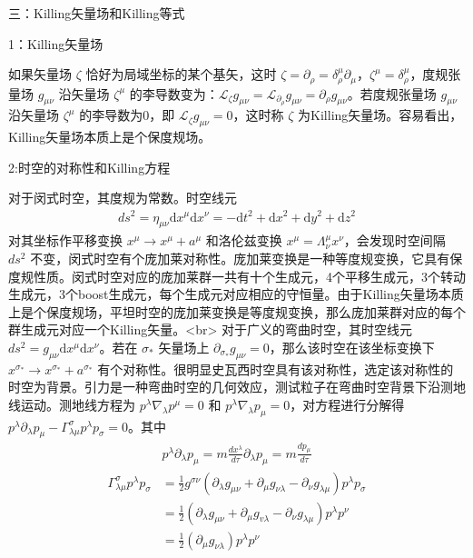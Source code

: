 三：Killing矢量场和Killing等式

1：Killing矢量场

如果矢量场 $\zeta$ 恰好为局域坐标的某个基矢，这时 $\zeta=\partial_{\rho}=\delta_{\rho}^{\mu} \partial_{\mu}$，$\zeta^{\mu}=\delta_{\rho}^{\mu}$，度规张量场 $g_{\mu \nu}$ 沿矢量场 $\zeta^{\mu}$ 的李导数变为：$\mathcal{L}_{\zeta} g_{\mu \nu} =\mathcal{L}_{\partial_{\rho}} g_{\mu \nu}=\partial_{\rho} g_{\mu \nu}$。若度规张量场 $g_{\mu \nu}$ 沿矢量场 $\zeta^{\mu}$ 的李导数为0，即 $\mathcal{L}_{\zeta} g_{\mu \nu} =0$，这时称 $\zeta$ 为Killing矢量场。容易看出，Killing矢量场本质上是个保度规场。

2:时空的对称性和Killing方程

对于闵式时空，其度规为常数。时空线元
$$\begin{aligned}
d s^{2}=\eta_{\mu \nu} \mathrm{d} x^{\mu} \mathrm{d} x^{\nu}=-\mathrm{d} t^{2}+\mathrm{d} x^{2}+\mathrm{d} y^{2}+\mathrm{d} z^{2}
\end{aligned}$$
对其坐标作平移变换 $x^{\mu}\rightarrow x^{\mu}+a^{\mu}$ 和洛伦兹变换 $x^{\mu}=\Lambda^{\mu}_{\nu} x^{\nu}$，会发现时空间隔 $d s^{2}$ 不变，闵式时空有个庞加莱对称性。庞加莱变换是一种等度规变换，它具有保度规性质。闵式时空对应的庞加莱群一共有十个生成元，4个平移生成元，3个转动生成元，3个boost生成元，每个生成元对应相应的守恒量。由于Killing矢量场本质上是个保度规场，平坦时空的庞加莱变换是等度规变换，那么庞加莱群对应的每个群生成元对应一个Killing矢量。<br>
对于广义的弯曲时空，其时空线元 $d s^{2}=g_{\mu \nu} \mathrm{d} x^{\mu} \mathrm{d} x^{\nu}$。若在 $\sigma_{*}$ 矢量场上 $\partial_{\sigma_{*}} g_{\mu \nu}=0$，那么该时空在该坐标变换下 $x^{\sigma_{*}} \rightarrow x^{\sigma_{*}}+a^{\sigma_{*}}$ 有个对称性。很明显史瓦西时空具有该对称性，选定该对称性的时空为背景。引力是一种弯曲时空的几何效应，测试粒子在弯曲时空背景下沿测地线运动。测地线方程为 $p^{\lambda} \nabla_{\lambda} p^{\mu}=0$ 和 $p^{\lambda} \nabla_{\lambda} p_{\mu}=0$，对方程进行分解得 $p^{\lambda} \partial_{\lambda} p_{\mu}-\Gamma_{\lambda \mu}^{\sigma} p^{\lambda} p_{\sigma}=0$。其中$$\begin{aligned}
p^{\lambda} \partial_{\lambda} p_{\mu}=m \frac{d x^{\lambda}}{d \tau} \partial_{\lambda} p_{\mu}=m \frac{d p_{\mu}}{d \tau}\end{aligned}$$
$$\begin{aligned}
\Gamma_{\lambda \mu}^{\sigma} p^{\lambda} p_{\sigma} &=\frac{1}{2} g^{\sigma \nu}\left(\partial_{\lambda} g_{\mu \nu}+\partial_{\mu} g_{\nu\lambda}-\partial_{\nu} g_{\lambda \mu}\right) p^{\lambda} p_{\sigma} \\
&=\frac{1}{2}\left(\partial_{\lambda} g_{\mu \nu}+\partial_{\mu} g_{v \lambda}-\partial_{\nu} g_{\lambda \mu}\right) p^{\lambda} p^{\nu} \\
&=\frac{1}{2}\left(\partial_{\mu} g_{\nu \lambda}\right) p^{\lambda} p^{\nu}
\end{aligned}$$
